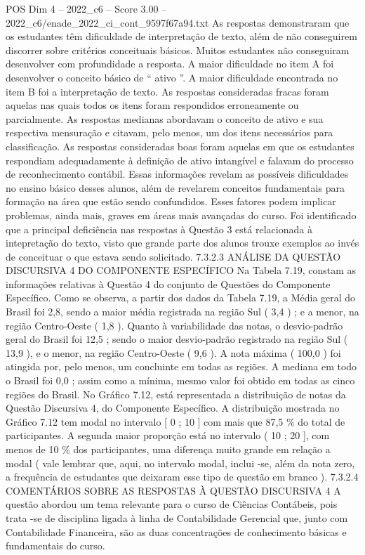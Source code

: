 \begin{textsample}{POS Dim 4 – 2022\_c6 – Score 3.00 – 2022\_c6/enade\_2022\_ci\_cont\_9597f67a94.txt}
As respostas demonstraram que os estudantes têm dificuldade de interpretação de texto, além de não conseguirem discorrer sobre critérios conceituais básicos.
Muitos estudantes não conseguiram desenvolver com profundidade a resposta.
A maior dificuldade no item A foi desenvolver o conceito básico de “ ativo ”.
A maior dificuldade encontrada no item B foi a interpretação de texto.
As respostas consideradas fracas foram aquelas nas quais todos os itens foram respondidos erroneamente ou parcialmente.
As respostas medianas abordavam o conceito de ativo e sua respectiva mensuração e citavam, pelo menos, um dos itens necessários para classificação.
As respostas consideradas boas foram aquelas em que os estudantes respondiam adequadamente à definição de ativo intangível e falavam do processo de reconhecimento contábil.
Essas informações revelam as possíveis dificuldades no ensino básico desses alunos, além de revelarem conceitos fundamentais para formação na área que estão sendo confundidos.
Esses fatores podem implicar problemas, ainda mais, graves em áreas mais avançadas do curso.
Foi identificado que a principal deficiência nas respostas à Questão 3 está relacionada à intepretação do texto, visto que grande parte dos alunos trouxe exemplos ao invés de conceituar o que estava sendo solicitado. 7.3.2.3 ANÁLISE DA QUESTÃO DISCURSIVA 4 DO COMPONENTE ESPECÍFICO Na Tabela 7.19, constam as informações relativas à Questão 4 do conjunto de Questões do Componente Específico.
Como se observa, a partir dos dados da Tabela 7.19, a Média geral do Brasil foi 2,8, sendo a maior média registrada na região Sul ( 3,4 ) ; e a menor, na região Centro-Oeste ( 1,8 ).
Quanto à variabilidade das notas, o desvio-padrão geral do Brasil foi 12,5 ; sendo o maior desvio-padrão registrado na região Sul ( 13,9 ), e o menor, na região Centro-Oeste ( 9,6 ).
A nota máxima ( 100,0 ) foi atingida por, pelo menos, um concluinte em todas as regiões.
A mediana em todo o Brasil foi 0,0 ; assim como a mínima, mesmo valor foi obtido em todas as cinco regiões do Brasil.
No Gráfico 7.12, está representada a distribuição de notas da Questão Discursiva 4, do Componente Específico.
A distribuição mostrada no Gráfico 7.12 tem modal no intervalo [ 0 ; 10 ] com mais que 87,5 \% do total de participantes.
A segunda maior proporção está no intervalo ( 10 ; 20 ], com menos de 10 \% dos participantes, uma diferença muito grande em relação a modal ( vale lembrar que, aqui, no intervalo modal, inclui -se, além da nota zero, a frequência de estudantes que deixaram esse tipo de questão em branco ). 7.3.2.4 COMENTÁRIOS SOBRE AS RESPOSTAS À QUESTÃO DISCURSIVA 4 A questão abordou um tema relevante para o curso de Ciências Contábeis, pois trata -se de disciplina ligada à linha de Contabilidade Gerencial que, junto com Contabilidade Financeira, são as duas concentrações de conhecimento básicas e fundamentais do curso.

\end{textsample}

